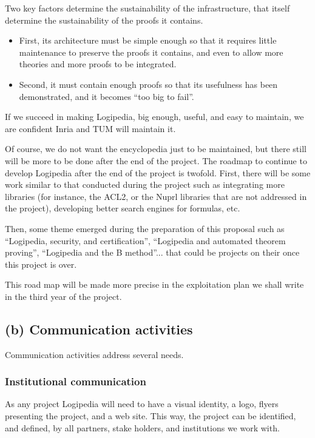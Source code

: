 Two key factors determine the sustainability of the infrastructure,
that itself determine the sustainability of the proofs it contains.
\begin{itemize}
\item First, its architecture must be simple enough so that it requires
  little maintenance to preserve the proofs it contains, and even to
  allow more theories and more proofs to be integrated.
\item Second, it must contain enough proofs so that its usefulness has been
demonstrated, and it becomes ``too big to fail''.
\end{itemize} 

If we succeed in making Logipedia, big enough, useful, and easy to
maintain, we are confident Inria and TUM will maintain it.

Of course, we do not want the encyclopedia just to be maintained, but
there still will be more to be done after the end of the project. The
roadmap to continue to develop Logipedia after the end of the project
is twofold. First, there will be some work similar to that conducted
during the project such as integrating more libraries (for instance,
the ACL2, or the Nuprl libraries that are not addressed in the
project), developing better search engines for formulas, etc. 

Then, some theme emerged during the preparation of this proposal such
as ``Logipedia, security, and certification'', ``Logipedia and
automated theorem proving'', ``Logipedia and the B method''... that
could be projects on their once this project is over.

This road map will be made more precise in the exploitation plan 
we shall write in the third year of the project. 

\subsection*{(b) Communication activities}

Communication activities address several needs. 

\subsubsection*{Institutional communication}

As any project Logipedia will need to have a visual identity, a logo,
flyers presenting the project, and a web site. 
This way, the project can be identified, and defined, by all partners, 
stake holders, and institutions we work with. 

